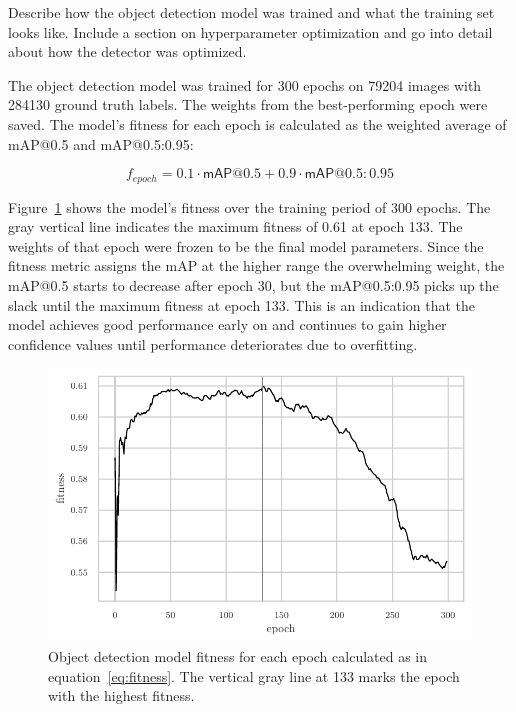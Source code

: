 \documentclass[draft,final]{vutinfth} %
\begin{document}
Describe how the object detection model was trained and what the
training set looks like. Include a section on hyperparameter
optimization and go into detail about how the detector was optimized.

The object detection model was trained for 300 epochs on 79204 images
with 284130 ground truth labels. The weights from the best-performing
epoch were saved. The model's fitness for each epoch is calculated as
the weighted average of \textsf{mAP}@0.5 and \textsf{mAP}@0.5:0.95:

\begin{equation}
  \label{eq:fitness}
  f_{epoch} = 0.1 \cdot \mathsf{mAP}@0.5 + 0.9 \cdot \mathsf{mAP}@0.5\mathrm{:}0.95
\end{equation}

Figure~\ref{fig:fitness} shows the model's fitness over the training
period of 300 epochs. The gray vertical line indicates the maximum
fitness of 0.61 at epoch 133. The weights of that epoch were frozen to
be the final model parameters. Since the fitness metric assigns the
\textsf{mAP} at the higher range the overwhelming weight, the
\textsf{mAP}@0.5 starts to decrease after epoch 30, but the
\textsf{mAP}@0.5:0.95 picks up the slack until the maximum fitness at
epoch 133. This is an indication that the model achieves good
performance early on and continues to gain higher confidence values
until performance deteriorates due to overfitting.

\begin{figure}
  \centering
  \includegraphics{graphics/model_fitness.pdf}
  \caption[Object detection fitness per epoch.]{Object detection model
    fitness for each epoch calculated as in
    equation~\ref{eq:fitness}. The vertical gray line at 133 marks the
    epoch with the highest fitness.}
  \label{fig:fitness}
\end{figure}
\end{document}
